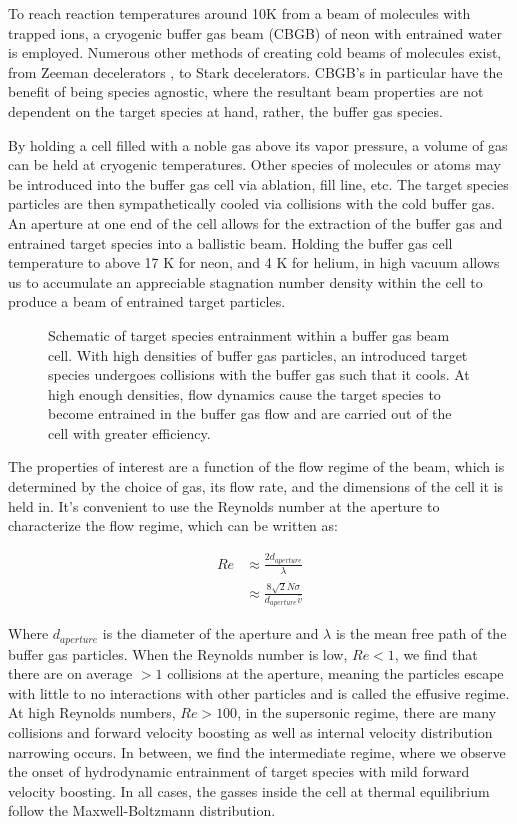To reach reaction temperatures around 10K from a beam of molecules with trapped ions, a cryogenic buffer gas beam (CBGB) of neon with entrained water is employed. Numerous other methods of creating cold beams of molecules exist, from Zeeman decelerators \cite{Narevicius2008}, to Stark decelerators. CBGB's in particular have the benefit of being species agnostic, where the resultant beam properties are not dependent on the target species at hand, rather, the buffer gas species. 

By holding a cell filled with a noble gas above its vapor pressure, a volume of gas can be held at cryogenic temperatures. Other species of molecules or atoms may be introduced into the buffer gas cell via ablation, fill line, etc. The target species particles are then sympathetically cooled via collisions with the cold buffer gas. An aperture at one end of the cell allows for the extraction of the buffer gas and entrained target species into a ballistic beam. Holding the buffer gas cell temperature to above 17 K for neon, and 4 K for helium, in high vacuum allows us to accumulate an appreciable stagnation number density within the cell to produce a beam of entrained target particles.

\begin{figure}
	\centering
	\caption{Schematic of target species entrainment within a buffer gas beam cell. With high densities of buffer gas particles, an introduced target species undergoes collisions with the buffer gas such that it cools. At high enough densities, flow dynamics cause the target species to become entrained in the buffer gas flow and are carried out of the cell with greater efficiency.}
\end{figure}

The properties of interest are a function of the flow regime of the beam, which is determined by the choice of gas, its flow rate, and the dimensions of the cell it is held in. It's convenient to use the Reynolds number at the aperture to characterize the flow regime, which can be written as:

\begin{align}
	Re & \approx \frac{2 d_{aperture}}{\lambda} \nonumber \\
	& \approx \frac{8\sqrt{2} \dot{N} \sigma}{d_{aperture} \bar{v}} \label{eq: reynolds}
\end{align}

Where $d_{aperture}$ is the diameter of the aperture and $\lambda$ is the mean free path of the buffer gas particles.\cite{Hutzler2012} When the Reynolds number is low, $Re<1$, we find that there are on average $>1$ collisions at the aperture, meaning the particles escape with little to no interactions with other particles and is called the effusive regime. At high Reynolds numbers, $Re>100$, in the supersonic regime, there are many collisions and forward velocity boosting as well as internal velocity distribution narrowing occurs. In between, we find the intermediate regime, where we observe the onset of hydrodynamic entrainment of target species with mild forward velocity boosting. In all cases, the gasses inside the cell at thermal equilibrium follow the Maxwell-Boltzmann distribution.

